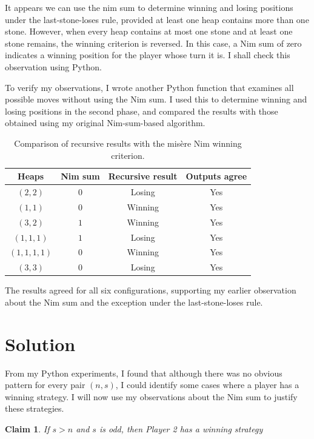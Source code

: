 \documentclass[11pt]{article}
\newcommand{\keywordfont}{\textsc}
\newcommand{\keyword}[1]{%
  \marginpar{\raggedright\small\keywordfont{#1}}}
\newtheorem{claim}{Claim}
\begin{document}
\keyword{AHA}

It appears we can use the nim sum to determine winning and losing positions
under the last-stone-loses rule, provided
at least one heap contains more than one stone.
However, when every heap contains at most
one stone and at least one stone remains,
the winning criterion is reversed.
In this case, a Nim sum of zero indicates
a winning position for the player whose
turn it is.
I shall check this observation
using Python.



\keyword{CHECK}

To verify my observations, I wrote another
Python function that examines all possible
moves without using the Nim sum.
I used this to determine winning and
losing positions in the second phase,
and compared the results with those
obtained using my original
Nim-sum-based algorithm.

\begin{table}[h]
\centering
\begin{tabular}{|c|c|c|c|}
\hline
Heaps & Nim sum & Recursive result & Outputs agree \\
\hline
$(2,2)$ & $0$ & Losing & Yes \\
$(1,1)$ & $0$ & Winning & Yes \\
$(3,2)$ & $1$ & Winning & Yes \\
$(1,1,1)$ & $1$ & Losing & Yes \\
$(1,1,1,1)$ & $0$ & Winning & Yes \\
$(3,3)$ & $0$ & Losing & Yes \\
\hline
\end{tabular}
\caption{Comparison of recursive results with the
mis\`ere Nim winning criterion.}
\end{table}


\keyword{NOTE}
The results agreed for all six configurations, supporting my earlier observation about the
Nim sum and the exception under the
last-stone-loses rule.


\section{Solution}
From my Python experiments, I found that although there was no obvious pattern for every pair $(n,s)$, I could identify some cases where a player has a winning strategy.
I will now use my observations about the Nim sum to justify these strategies.


\begin{claim}
If $s>n$ and $s$ is odd, then Player 2 has a winning strategy
\end{claim}
\end{document}

